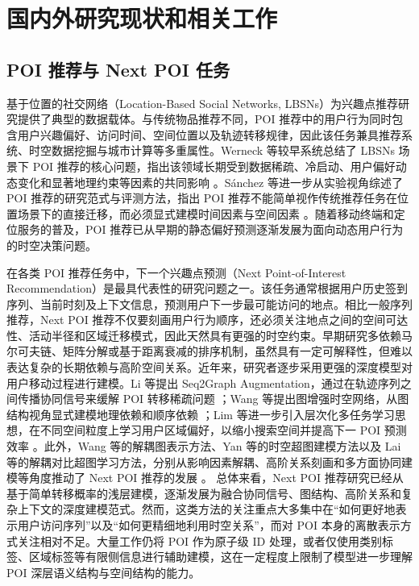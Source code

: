 


\section{国内外研究现状和相关工作}
\label{sec:related_work}

\subsection{POI 推荐与 Next POI 任务}

基于位置的社交网络（Location-Based Social Networks, LBSNs）为兴趣点推荐研究提供了典型的数据载体。与传统物品推荐不同，POI 推荐中的用户行为同时包含用户兴趣偏好、访问时间、空间位置以及轨迹转移规律，因此该任务兼具推荐系统、时空数据挖掘与城市计算等多重属性。Werneck 等较早系统总结了 LBSNs 场景下 POI 推荐的核心问题，指出该领域长期受到数据稀疏、冷启动、用户偏好动态变化和显著地理约束等因素的共同影响 \cite{zhao2016survey}。S{\'a}nchez 等进一步从实验视角综述了 POI 推荐的研究范式与评测方法，指出 POI 推荐不能简单视作传统推荐任务在位置场景下的直接迁移，而必须显式建模时间因素与空间因素 \cite{sanchez2021survey}。随着移动终端和定位服务的普及，POI 推荐已从早期的静态偏好预测逐渐发展为面向动态用户行为的时空决策问题。

在各类 POI 推荐任务中，下一个兴趣点预测（Next Point-of-Interest Recommendation）是最具代表性的研究问题之一。该任务通常根据用户历史签到序列、当前时刻及上下文信息，预测用户下一步最可能访问的地点。相比一般序列推荐，Next POI 推荐不仅要刻画用户行为顺序，还必须关注地点之间的空间可达性、活动半径和区域迁移模式，因此天然具有更强的时空约束。早期研究多依赖马尔可夫链、矩阵分解或基于距离衰减的排序机制，虽然具有一定可解释性，但难以表达复杂的长期依赖与高阶空间关系。近年来，研究者逐步采用更强的深度模型对用户移动过程进行建模。Li 等提出 Seq2Graph Augmentation，通过在轨迹序列之间传播协同信号来缓解 POI 转移稀疏问题 \cite{li2021seq2graph}；Wang 等提出图增强时空网络，从图结构视角显式建模地理依赖和顺序依赖 \cite{wang2022graph}；Lim 等进一步引入层次化多任务学习思想，在不同空间粒度上学习用户区域偏好，以缩小搜索空间并提高下一 POI 预测效率 \cite{lim2022hmtgrn}。此外，Wang 等的解耦图表示方法、Yan 等的时空超图建模方法以及 Lai 等的解耦对比超图学习方法，分别从影响因素解耦、高阶关系刻画和多方面协同建模等角度推动了 Next POI 推荐的发展 \cite{wang2022dran,yan2023sthgcn,lai2024dchl}。
总体来看，Next POI 推荐研究已经从基于简单转移概率的浅层建模，逐渐发展为融合协同信号、图结构、高阶关系和复杂上下文的深度建模范式。然而，这类方法的关注重点大多集中在“如何更好地表示用户访问序列”以及“如何更精细地利用时空关系”，而对 POI 本身的离散表示方式关注相对不足。大量工作仍将 POI 作为原子级 ID 处理，或者仅使用类别标签、区域标签等有限侧信息进行辅助建模，这在一定程度上限制了模型进一步理解 POI 深层语义结构与空间结构的能力。

